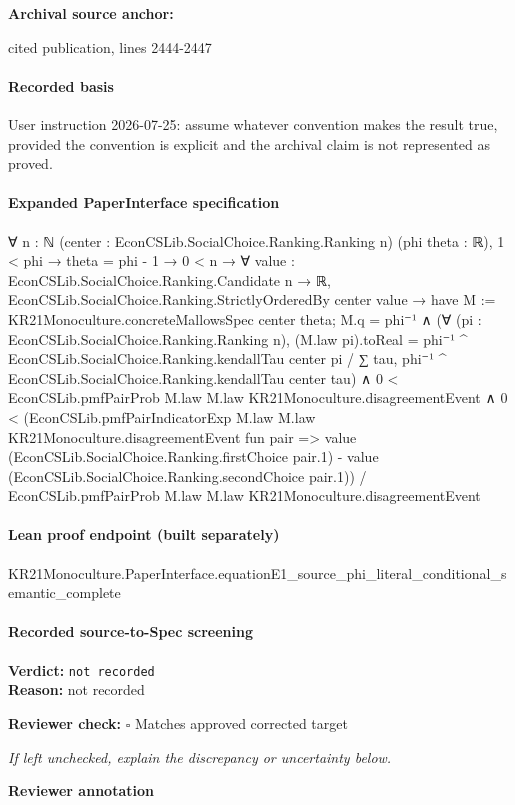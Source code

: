 \documentclass[10pt]{article}
\newcommand{\reviewerbox}{%
  \par\noindent\fbox{\parbox{0.96\linewidth}{\rule{0pt}{0.38in}}}\par
}
\newcommand{\reviewmatch}[1]{%
  \par\noindent\textbf{Reviewer check:} $\square$\; #1\par
  \noindent\emph{If left unchecked, explain the discrepancy or uncertainty below.}\par
}
\begin{document}
\textbf{Archival source anchor:} {\footnotesize\raggedright cited publication, lines 2444-\allowbreak{}2447\par}
\paragraph{Recorded basis}
User instruction 2026-\allowbreak{}07-\allowbreak{}25:\allowbreak{} assume whatever convention makes the result true, provided the convention is explicit and the archival claim is not represented as proved.\allowbreak{}
\paragraph{Expanded PaperInterface specification}
\begin{ReviewVerbatim}
∀ {n : ℕ} (center : EconCSLib.SocialChoice.Ranking.Ranking n) (phi theta : ℝ),
  1 < phi →
    theta = phi - 1 →
      0 < n →
        ∀ {value : EconCSLib.SocialChoice.Ranking.Candidate n → ℝ},
          EconCSLib.SocialChoice.Ranking.StrictlyOrderedBy center value →
            have M := KR21Monoculture.concreteMallowsSpec center theta;
            M.q = phi⁻¹ ∧
              (∀ (pi : EconCSLib.SocialChoice.Ranking.Ranking n),
                  (M.law pi).toReal =
                    phi⁻¹ ^ EconCSLib.SocialChoice.Ranking.kendallTau center pi /
                      ∑ tau, phi⁻¹ ^ EconCSLib.SocialChoice.Ranking.kendallTau center tau) ∧
                0 < EconCSLib.pmfPairProb M.law M.law KR21Monoculture.disagreementEvent ∧
                  0 <
                    (EconCSLib.pmfPairIndicatorExp M.law M.law KR21Monoculture.disagreementEvent fun pair =>
                        value (EconCSLib.SocialChoice.Ranking.firstChoice pair.1) -
                          value (EconCSLib.SocialChoice.Ranking.secondChoice pair.1)) /
                      EconCSLib.pmfPairProb M.law M.law KR21Monoculture.disagreementEvent
\end{ReviewVerbatim}

\paragraph{Lean proof endpoint (built separately)}\begin{ReviewVerbatim}
KR21Monoculture.PaperInterface.equationE1_source_phi_literal_conditional_semantic_complete
\end{ReviewVerbatim}

\paragraph{Recorded source-to-Spec screening}
\textbf{Verdict:} \texttt{not recorded}
\\
\textbf{Reason:} not recorded
\reviewmatch{Matches approved corrected target}
\noindent\textbf{Reviewer annotation}\par
\reviewerbox
\clearpage
\hypertarget{source-claim-73dd5d1917ec1a7c}{}
\end{document}
